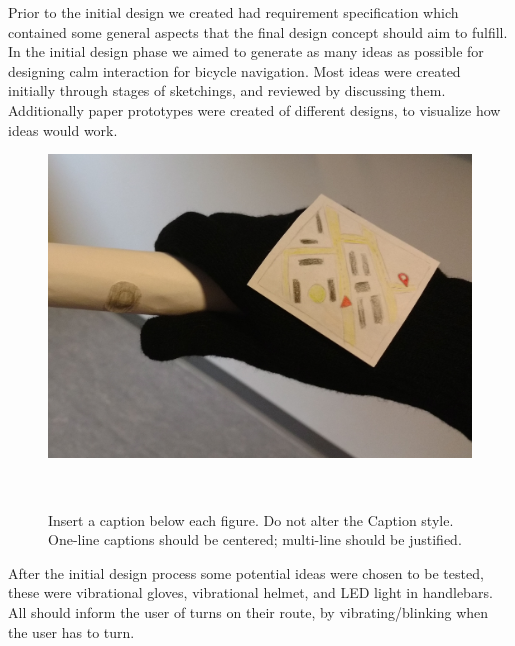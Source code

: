 \documentclass{sigchi}
\begin{document}
Prior to the initial design we created had requirement specification which contained some general aspects that the final design concept should aim to fulfill. In the initial design phase we aimed to generate as many ideas as possible for designing calm interaction for bicycle navigation. Most ideas were created initially through stages of sketchings, and reviewed by discussing them. Additionally paper prototypes were created of different designs, to visualize how ideas would work.
\begin{figure}
\centering
  \includegraphics[width=0.9\columnwidth]{figures/handle-button.jpg}
  \caption{Insert a caption below each figure. Do not alter the
    Caption style.  One-line captions should be centered; multi-line
    should be justified. }~\label{fig:figure1}
\end{figure}
After the initial design process some potential ideas were chosen to be tested, these were vibrational gloves, vibrational helmet, and LED light in handlebars. All should inform the user of turns on their route, by vibrating/blinking when the user has to turn.
\end{document}
